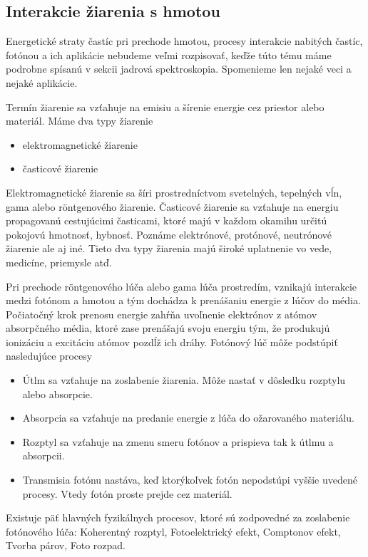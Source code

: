 \documentclass[../../main.tex]{subfiles}
\begin{document}
\subsection{Interakcie žiarenia s hmotou} 
Energetické straty častíc pri prechode hmotou, procesy interakcie nabitých častíc, fotónou a ich aplikácie nebudeme veľmi rozpisovať, keďže túto tému máme podrobne spísanú v sekcii jadrová spektroskopia. Spomenieme len nejaké veci a nejaké aplikácie.
\newline

Termín žiarenie sa vzťahuje na emisiu a šírenie energie cez priestor alebo materiál. Máme dva typy žiarenie
\begin{itemize}
\item elektromagnetické žiarenie
\item časticové žiarenie
\end{itemize}

Elektromagnetické žiarenie sa šíri prostredníctvom svetelných, tepelných vĺn, gama alebo röntgenového žiarenie. Časticové žiarenie sa vzťahuje na energiu propagovanú cestujúcimi časticami, ktoré majú v každom okamihu určitú pokojovú hmotnosť, hybnosť. Poznáme elektrónové, protónové, neutrónové žiarenie ale aj iné. Tieto dva typy žiarenia majú široké uplatnenie vo vede, medicíne, priemysle atď. 

Pri prechode röntgenového lúča alebo gama lúča prostredím, vznikajú interakcie medzi fotónom a hmotou a tým dochádza k prenášaniu energie z lúčov do média. Počiatočný krok prenosu energie zahŕňa uvoľnenie elektrónov z atómov absorpčného média, ktoré zase prenášajú svoju energiu tým, že produkujú ionizáciu a excitáciu atómov pozdĺž ich dráhy. Fotónový lúč môže podstúpiť nasledujúce procesy
\begin{itemize}
\item Útlm sa vzťahuje na zoslabenie žiarenia. Môže nastať v dôsledku rozptylu alebo absorpcie.
\item Absorpcia sa vzťahuje na predanie energie z lúča do ožarovaného materiálu.
\item Rozptyl sa vzťahuje na zmenu smeru fotónov a prispieva tak k útlmu a absorpcii.
\item Transmisia fotónu nastáva, keď ktorýkoľvek fotón nepodstúpi vyššie uvedené procesy. Vtedy fotón proste prejde cez materiál.
\end{itemize}

Existuje päť hlavných fyzikálnych procesov, ktoré sú zodpovedné za zoslabenie fotónového lúča: Koherentný rozptyl, Fotoelektrický efekt, Comptonov efekt, Tvorba párov, Foto rozpad.
\end{document}
